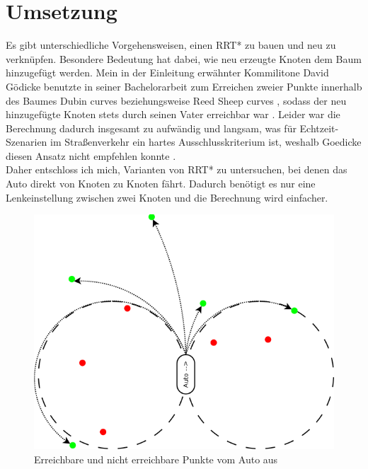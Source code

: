 \section{Umsetzung}
\label{sec:Umsetzung}
Es gibt unterschiedliche Vorgehensweisen, einen RRT* zu bauen und neu zu verknüpfen. Besondere Bedeutung hat dabei, wie neu erzeugte Knoten dem Baum hinzugefügt werden. Mein in der Einleitung erwähnter Kommilitone David Gödicke benutzte in seiner Bachelorarbeit zum Erreichen zweier Punkte innerhalb des Baumes Dubin curves \citep{Dubin61} beziehungsweise Reed Sheep curves \citep{reeds1990optimal}, sodass der neu hinzugefügte Knoten stets durch seinen Vater erreichbar war \citep{Goedicke18}. Leider war die Berechnung dadurch insgesamt zu aufwändig und langsam, was für Echtzeit-Szenarien im Straßenverkehr ein hartes Ausschlusskriterium ist, weshalb Goedicke diesen Ansatz nicht empfehlen konnte \citep[vergleiche][Kapitel 7]{Goedicke18}. \\
Daher entschloss ich mich, Varianten von RRT* zu untersuchen, bei denen das Auto direkt von Knoten zu Knoten fährt. Dadurch benötigt es nur eine Lenkeinstellung zwischen zwei Knoten und die Berechnung wird einfacher.\\
\begin{figure}
\label{fig:reachable}
\centering
\includegraphics[scale=0.5]{Bilder/Erreichbarkeit_Punkte.png} 
\caption{Erreichbare und nicht erreichbare Punkte vom Auto aus}
\end{figure}
